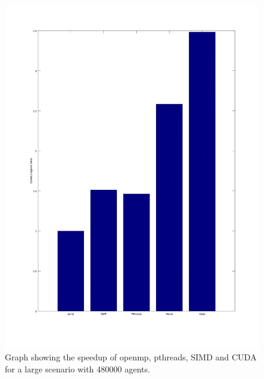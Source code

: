 \documentclass[a4paper,11pt]{article}
\begin{document}
\begin{figure}[h!]
\includegraphics[width=\textwidth]{graph2.png}
\caption{Graph showing the speedup of openmp, pthreads, SIMD and CUDA for a large scenario with 480000 agents.}
\label{graph2}
\end{figure}
\end{document}
